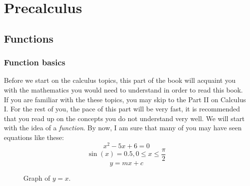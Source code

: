 

\part{Precalculus}
\chapter{Functions}
\section{Function basics}

Before we start on the calculus topics, this part of the book will acquaint you with the mathematics you would need to understand in order to read this book. If you are familiar with the these topics, you may skip to the Part II on Calculus I. For the rest of you, the pace of this part will be very fast, it is recommended that you read up on the concepts you do not understand very well. We will start with the idea of a \textit{function}. By now, I am sure that many of you may have seen equations like these:
\begin{equation}
  x^2-5x+6=0
\end{equation}
\begin{equation}
  \sin(x)=0.5, 0\leq x \leq\frac{\pi}{2}
\end{equation}
\begin{equation}
  \label{line}
  y=mx+c
\end{equation}

\begin{figure}
  \centering
  \caption{Graph of \(y=x\).}
\end{figure}

